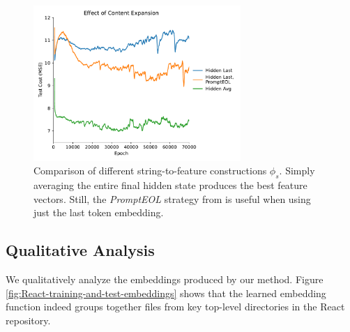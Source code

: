 \documentclass{article}
\begin{document}
\begin{figure}[H]
  \centering
  \includegraphics[width=0.7\textwidth]{figures/content_expansion.pdf}
  \caption{Comparison of different string-to-feature constructions $\phi_s$. Simply averaging the entire final hidden state produces the best feature vectors. Still, the \emph{PromptEOL} strategy from \cite{jiang2023scalingsentenceembeddingslarge} is useful when using just the last token embedding.}
  \label{fig:content-expansion}
\end{figure}

\subsection{Qualitative Analysis}

We qualitatively analyze the embeddings produced by our method. Figure \ref{fig:React-training-and-test-embeddings} shows that the learned embedding function indeed groups together files from key top-level directories in the React repository.
\end{document}
